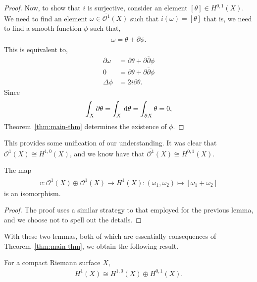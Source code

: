 \begin{lemma}
\begin{proof}
		Now, to show that $ i $ is surjective, consider an element $ [ \theta ]\in H
				^{0,1}(X) $. We need to find an element $ \omega \in
			\overline{\mathcal{O}^{1}}(X) $ such that $ i ( \omega ) = [ \theta ] $ that
		is, we need to find a smooth function $ \phi $ such that,
		\begin{align*}
			\omega = \theta + \overline{\partial }\phi.
		\end{align*}
		This is equivalent to,
		\begin{align*}
			\partial \omega & = \partial \theta + \partial \overline{\partial }\phi \\
			0               & = \partial \theta + \partial \overline{\partial }\phi \\
			\Delta \phi     & = 2i\partial \theta.
		\end{align*}
		Since
		\begin{align*}
			\int_{X}{\partial \theta} = \int_{X}{\operatorname{\, d\!}{\theta}} = \int_{\partial
				X}{\theta}=0,
		\end{align*}
		Theorem~\ref{thm:main-thm} determines the existence of $ \phi $.
	\end{proof}
\end{lemma}

\begin{remark}
	This provides some unification of our understanding. It was clear that $
		\mathcal{O}^{1}(X) \cong H ^{1,0}(X) $, and we know have that $
		\overline{\mathcal{O}^{1}}(X) \cong H ^{0,1}(X) $.
\end{remark}

\begin{lemma}
	The map
	\begin{align*}
		v: \mathcal{O}^{1}(X) \oplus \overline{\mathcal{O}^{1}}(X) \to H^1(X): (
		\omega_1, \omega_2 ) \mapsto [ \omega_1+\omega_2 ]
	\end{align*}
	is an isomorphism.
	\begin{proof}
		The proof uses a similar strategy to that employed for the previous lemma,
		and we choose not to spell out the details.
	\end{proof}
\end{lemma}

With these two lemmas, both of which are essentially consequences of
Theorem~\ref{thm:main-thm}, we obtain the following result.

\begin{theorem}
	For a compact Riemann surface $ X $,
	\begin{align*}
		H^1(X) \cong H ^{1,0}(X) \oplus H ^{0,1}(X).
	\end{align*}
\end{theorem}

